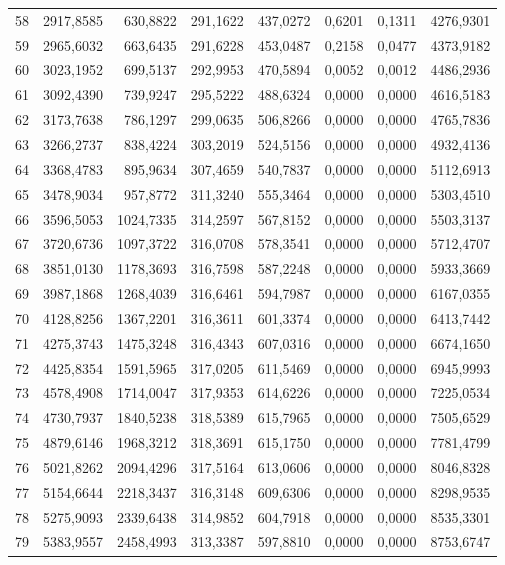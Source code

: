 \begin{small}
\begin{longtable}{rrrrrrrr}
58 & 2917,8585 & 630,8822 & 291,1622 & 437,0272 & 0,6201 & 0,1311 & 4276,9301 \\
59 & 2965,6032 & 663,6435 & 291,6228 & 453,0487 & 0,2158 & 0,0477 & 4373,9182 \\
60 & 3023,1952 & 699,5137 & 292,9953 & 470,5894 & 0,0052 & 0,0012 & 4486,2936 \\
61 & 3092,4390 & 739,9247 & 295,5222 & 488,6324 & 0,0000 & 0,0000 & 4616,5183 \\
62 & 3173,7638 & 786,1297 & 299,0635 & 506,8266 & 0,0000 & 0,0000 & 4765,7836 \\
63 & 3266,2737 & 838,4224 & 303,2019 & 524,5156 & 0,0000 & 0,0000 & 4932,4136 \\
64 & 3368,4783 & 895,9634 & 307,4659 & 540,7837 & 0,0000 & 0,0000 & 5112,6913 \\
65 & 3478,9034 & 957,8772 & 311,3240 & 555,3464 & 0,0000 & 0,0000 & 5303,4510 \\
66 & 3596,5053 & 1024,7335 & 314,2597 & 567,8152 & 0,0000 & 0,0000 & 5503,3137 \\
67 & 3720,6736 & 1097,3722 & 316,0708 & 578,3541 & 0,0000 & 0,0000 & 5712,4707 \\
68 & 3851,0130 & 1178,3693 & 316,7598 & 587,2248 & 0,0000 & 0,0000 & 5933,3669 \\
69 & 3987,1868 & 1268,4039 & 316,6461 & 594,7987 & 0,0000 & 0,0000 & 6167,0355 \\
70 & 4128,8256 & 1367,2201 & 316,3611 & 601,3374 & 0,0000 & 0,0000 & 6413,7442 \\
71 & 4275,3743 & 1475,3248 & 316,4343 & 607,0316 & 0,0000 & 0,0000 & 6674,1650 \\
72 & 4425,8354 & 1591,5965 & 317,0205 & 611,5469 & 0,0000 & 0,0000 & 6945,9993 \\
73 & 4578,4908 & 1714,0047 & 317,9353 & 614,6226 & 0,0000 & 0,0000 & 7225,0534 \\
74 & 4730,7937 & 1840,5238 & 318,5389 & 615,7965 & 0,0000 & 0,0000 & 7505,6529 \\
75 & 4879,6146 & 1968,3212 & 318,3691 & 615,1750 & 0,0000 & 0,0000 & 7781,4799 \\
76 & 5021,8262 & 2094,4296 & 317,5164 & 613,0606 & 0,0000 & 0,0000 & 8046,8328 \\
77 & 5154,6644 & 2218,3437 & 316,3148 & 609,6306 & 0,0000 & 0,0000 & 8298,9535 \\
78 & 5275,9093 & 2339,6438 & 314,9852 & 604,7918 & 0,0000 & 0,0000 & 8535,3301 \\
79 & 5383,9557 & 2458,4993 & 313,3387 & 597,8810 & 0,0000 & 0,0000 & 8753,6747 \\

\end{longtable}
\end{small}
